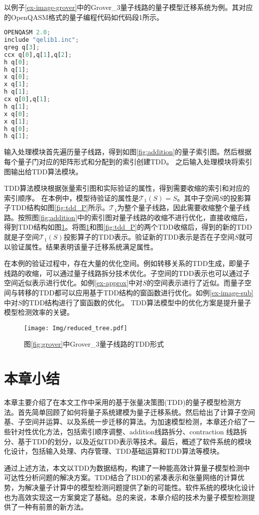 \begin{example}
    以例子\ref{ex-image-grover}中的Grover\_3量子线路的量子模型迁移系统为例。其对应的OpenQASM格式的量子编程代码如代码段1所示。
\begin{lstlisting}[language=Python, caption={Grover\_3量子线路的qasm代码}]
OPENQASM 2.0;
include "qelib1.inc";
qreg q[3];
ccx q[0],q[1],q[2];
h q[0];
h q[1];
x q[0];
x q[1];
h q[1];
cx q[0],q[1];
h q[1];
x q[0];
x q[1];
h q[0];
h q[1];
\end{lstlisting}
输入处理模块首先遍历量子线路，得到如图\ref{fig:addition}的量子索引图。然后根据每个量子门对应的矩阵形式和分配到的索引创建TDD。
之后输入处理模块将索引图输出给TDD算法模块。

TDD算法模块根据张量索引图和实际验证的属性，得到需要收缩的索引和对应的索引顺序。
在本例中，模型待验证的属性是\(\mathcal{T}_1(S)=S\)。其中子空间\(S\)的投影算子TDD结构如图\ref{fig:tdd_P}所示。\(\mathcal{T}_1\)为整个量子线路，因此需要收缩整个量子线路。按照图\ref{fig:addition}中的索引图对量子线路的收缩不进行优化，直接收缩后，得到TDD结构如图\ref{fig-tdd-grover}。将图\ref{fig-tdd-grover}和图\ref{fig:tdd_P}的两个TDD收缩后，得到的新的TDD就是子空间\(\mathcal{T}_1(S)\)投影算子的TDD表示。验证新的TDD表示是否在子空间\(S\)就可以验证属性。结果表明该量子迁移系统满足属性。

在本例的验证过程中，存在大量的优化空间。例如转移关系的TDD生成，即量子线路的收缩，可以通过量子线路拆分技术优化。子空间的TDD表示也可以通过子空间近似表示进行优化。如例\ref{ex-approx}中对\(S\)的空间表示进行了近似。而量子空间与转移的TDD都可以应用基于TDD结构的窗函数进行优化。如例\ref{ex-image-sub}中对\(S\)的TDD结构进行了窗函数的优化。
TDD算法模型中的优化方案是提升量子模型检测效率的关键。
\begin{figure}[htbp]
    \centering
    \texttt{[image: Img/reduced\_tree.pdf]}
    \caption{图\ref{fig:grover}中Grover\_3量子线路的TDD形式}
    \label{fig-tdd-grover}
\end{figure}
\end{example}
\section{本章小结}
本章主要介绍了在本文工作中采用的基于张量决策图(TDD)的量子模型检测方法。首先简单回顾了如何将量子系统建模为量子迁移系统。然后给出了计算子空间基、子空间并运算、以及系统一步迁移的算法。为加速模型检测，本章还介绍了一些针对性优化方法，包括索引顺序调整、addition线路拆分、contraction 线路拆分、基于TDD的划分，以及近似TDD表示等技术。最后，概述了软件系统的模块化设计，包括输入处理、内存管理、TDD基础运算和TDD算法等模块。

通过上述方法，本文以TDD为数据结构，构建了一种能高效计算量子模型检测中可达性分析问题的解决方案。TDD结合了BDD的紧凑表示和张量网络的计算优势，为解决量子计算中的模型检测问题提供了新的可能性。软件系统的模块化设计也为高效实现这一方案奠定了基础。总的来说，本章介绍的技术为量子模型检测提供了一种有前景的新方法。